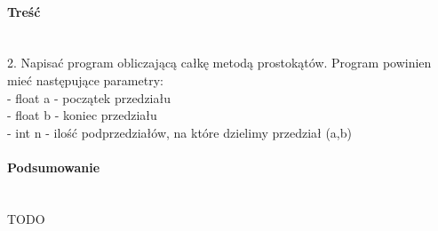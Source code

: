 \paragraph{Treść}~\\
2. Napisać program obliczającą całkę metodą prostokątów.
Program powinien mieć następujące parametry:\\
- float a - początek przedziału\\
- float b - koniec przedziału\\
- int n - ilość podprzedziałów, na które dzielimy przedział (a,b)



\paragraph{Podsumowanie}~\\
TODO
